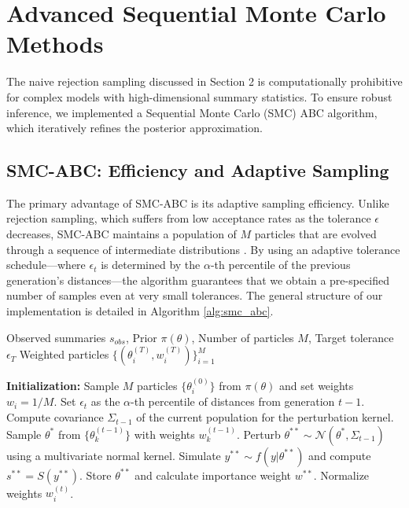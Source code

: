 \section{Advanced Sequential Monte Carlo Methods}

The naive rejection sampling discussed in Section 2 is computationally prohibitive for complex models with high-dimensional summary statistics.
To ensure robust inference, we implemented a Sequential Monte Carlo (SMC) ABC algorithm, which iteratively refines the posterior approximation.

\subsection{SMC-ABC: Efficiency and Adaptive Sampling}

The primary advantage of SMC-ABC is its adaptive sampling efficiency.
Unlike rejection sampling, which suffers from low acceptance rates as the tolerance $\epsilon$ decreases, SMC-ABC maintains a population of $M$ particles that are evolved through a sequence of intermediate distributions \parencite{beaumont2009adaptive, moores2015preprocessing}.
By using an adaptive tolerance schedule—where $\epsilon_t$ is determined by the $\alpha$-th percentile of the previous generation's distances—the algorithm guarantees that we obtain a pre-specified number of samples even at very small tolerances.
The general structure of our implementation is detailed in Algorithm \ref{alg:smc_abc}.

\begin{algorithm}[H]
\caption{Sequential Monte Carlo ABC with Adaptive Tolerance}
\label{alg:smc_abc}
\begin{algorithmic}[1]
    \Require Observed summaries $s_{obs}$, Prior $\pi(\theta)$, Number of particles $M$, Target tolerance $\epsilon_T$
    \Ensure Weighted particles $\{(\theta_i^{(T)}, w_i^{(T)})\}_{i=1}^M$
    
    \State \textbf{Initialization:} Sample $M$ particles $\{\theta_i^{(0)}\}$ from $\pi(\theta)$ and set weights $w_i = 1/M$.
        \State Set $\epsilon_t$ as the $\alpha$-th percentile of distances from generation $t-1$.
        \State Compute covariance $\Sigma_{t-1}$ of the current population for the perturbation kernel.
            \State Sample $\theta^*$ from $\{\theta_k^{(t-1)}\}$ with weights $w_k^{(t-1)}$.
            \State Perturb $\theta^{**} \sim \mathcal{N}(\theta^*, \Sigma_{t-1})$ using a multivariate normal kernel.
            \State Simulate $y^{**} \sim f(y|\theta^{**})$ and compute $s^{**} = S(y^{**})$.
                \State Store $\theta^{**}$ and calculate importance weight $w^{**}$.
            \EndIf
        \EndWhile
        \State Normalize weights $w_i^{(t)}$.
    \EndFor
\end{algorithmic}
\end{algorithm}

